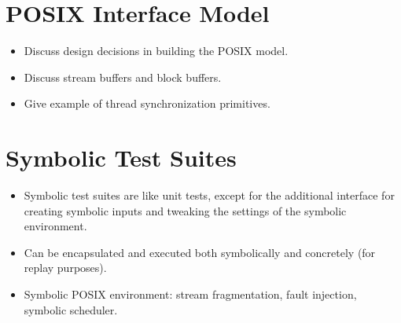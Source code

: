 
\section{POSIX Interface Model}

\begin{itemize}
\item Discuss design decisions in building the POSIX model.
\item Discuss stream buffers and block buffers.
\item Give example of thread synchronization primitives.
\end{itemize}


\section{Symbolic Test Suites}

\begin{itemize}
\item Symbolic test suites are like unit tests, except for the additional interface for creating symbolic inputs and tweaking the settings of the symbolic environment.
\item Can be encapsulated and executed both symbolically and concretely (for replay purposes).
\item Symbolic POSIX environment: stream fragmentation, fault injection, symbolic scheduler.
\end{itemize}


